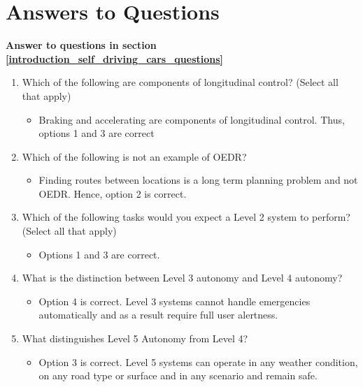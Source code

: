 \section{Answers to Questions}
\label{answer_questions}

{\textbf{Answer to questions in section \ref{introduction_self_driving_cars_questions}}}

\begin{enumerate}

\item Which of the following are components of longitudinal control? (Select all that apply)

\begin{itemize}
\item Braking and accelerating are components of longitudinal control. Thus, options 1 and 3 are correct
\end{itemize}

\item Which of the following is not an example of OEDR?

\begin{itemize}
\item Finding routes between locations is a long term planning problem and not OEDR. Hence, option 2 is correct.
\end{itemize}

\item Which of the following tasks would you expect a Level 2 system to perform? (Select all that apply)

\begin{itemize}
\item Options 1 and 3 are correct.
\end{itemize}

\item What is the distinction between Level 3 autonomy and Level 4 autonomy? 

\begin{itemize}
\item Option 4 is correct.  Level 3 systems cannot handle emergencies automatically and as a result require full user alertness.
\end{itemize}

\item What distinguishes Level 5 Autonomy from Level 4?

\begin{itemize}
\item Option 3 is correct. Level 5 systems can operate in any weather condition, on any road type or surface and in any scenario and remain safe.
\end{itemize}

\end{enumerate}

